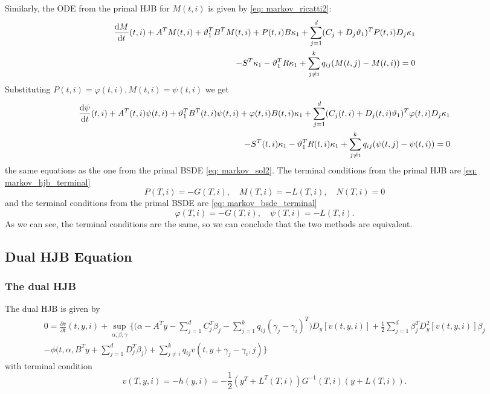 Similarly, the ODE from the primal HJB for $M(t,i)$ is given by \eqref{eq: markov_ricatti2}:
\begin{align*}
    \frac{\mathop{}\!\mathrm{d} M}{\mathop{}\!\mathrm{d} t}(t,i) + A^T M(t,i) +  \vartheta_1^T B^T M(t,i) +  P(t,i) B \kappa_1   + \sum_{j=1}^d (C_j + D_j \vartheta_1)^T P(t,i) D_j \kappa_1\\
    - S^T \kappa_1 - \vartheta_1^T R \kappa_1 + \sum_{j \ne i}^k q_{ij} (M(t,j) - M(t,i)) = 0
\end{align*}
Substituting $P(t,i) = \varphi(t,i), M(t,i) = \psi(t,i)$ we get 
\begin{align*}
    \frac{\mathop{}\!\mathrm{d} \psi}{\mathop{}\!\mathrm{d} t}(t,i) + A^T(t,i) \psi(t,i) +  \vartheta_1^T B^T(t,i) \psi(t,i) +  \varphi(t,i) B(t,i) \kappa_1
    + \sum_{j=1}^d (C_j(t,i) + D_j(t,i) \vartheta_1)^T \varphi(t,i) D_j \kappa_1\\
    - S^T(t,i) \kappa_1 - \vartheta_1^T R(t,i) \kappa_1 + \sum_{j \ne i}^k q_{ij} (\psi(t,j) - \psi(t,i)) = 0
\end{align*}
the same equations as the one from the primal BSDE \eqref{eq: markov_sol2}. The terminal conditions from the primal HJB are \eqref{eq: markov_hjb_terminal}
\begin{equation*}
    P(T,i) = -G(T,i), \quad M(T,i) = - L(T,i), \quad N(T, i) = 0
\end{equation*}
and the terminal conditions from the primal BSDE are \eqref{eq: markov_bsde_terminal}
\begin{equation}
    \varphi(T, i) = - G(T,i) ,\quad \psi(T,i) = - L(T,i).
\end{equation}
As we can see, the terminal conditions are the same, so we can conclude that the two methods are equivalent.


 \newpage
\subsection{Dual HJB Equation}
\subsubsection{The dual HJB}
The dual HJB is given by
\begin{align*}
    0 = \frac{\partial v}{\partial t}(t, y, i) + \sup_{\alpha, \beta, \gamma} \bigg\{ 
    \bigg(\alpha - A^T y - \sum_{j=1}^d C_j^T \beta_j - \sum_{j=1}^k q_{ij}(\gamma_j - \gamma_i)^T\bigg) D_y[v(t,y,i)] + \frac12 \sum_{j=1}^d \beta_j^T D_y^2[v(t,y,i)]\beta_j \\
    - \phi \big(t, \alpha, B^T y + \sum_{j=1}^d D_j^T \beta_j  \big) + \sum_{j \ne i}^k q_{ij} v(t, y+\gamma_j - \gamma_i, j)\bigg\}
\end{align*}
with terminal condition
\begin{equation*}
    v(T, y,i) = - h(y,i) = - \frac12 (y^T + L^T(T,i))G^{-1}(T,i)(y + L(T,i)).
\end{equation*}

